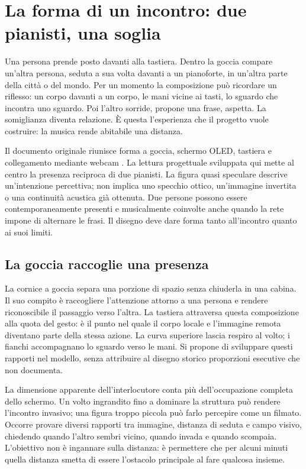 \chapter{La forma di un incontro: due pianisti, una soglia}\label{sec:design}

Una persona prende posto davanti alla tastiera. Dentro la goccia compare
un'altra persona, seduta a sua volta davanti a un pianoforte, in un'altra
parte della città o del mondo. Per un momento la composizione può ricordare
un riflesso: un corpo davanti a un corpo, le mani vicine ai tasti, lo sguardo
che incontra uno sguardo. Poi l'altro sorride, propone una frase, aspetta.
La somiglianza diventa relazione. È questa l'esperienza che il progetto
vuole costruire: la musica rende abitabile una distanza.

Il documento originale riunisce forma a goccia, schermo OLED, tastiera e
collegamento mediante webcam \cite[pp.~2--4]{terzi_peeragogy_2016}.
La lettura progettuale sviluppata qui mette al centro la presenza reciproca
di due pianisti. La figura quasi speculare descrive un'intenzione percettiva;
non implica uno specchio ottico, un'immagine invertita o una continuità
acustica già ottenuta. Due persone possono essere contemporaneamente
presenti e musicalmente coinvolte anche quando la rete impone di alternare
le frasi. Il disegno deve dare forma tanto all'incontro quanto ai suoi limiti.

\section{La goccia raccoglie una presenza}

La cornice a goccia separa una porzione di spazio senza chiuderla in una
cabina. Il suo compito è raccogliere l'attenzione attorno a una persona e
rendere riconoscibile il passaggio verso l'altra. La tastiera attraversa
questa composizione alla quota del gesto: è il punto nel quale il corpo
locale e l'immagine remota diventano parte della stessa azione. La curva
superiore lascia respiro al volto; i fianchi accompagnano lo sguardo verso
le mani. Si propone di sviluppare questi rapporti nel modello, senza
attribuire al disegno storico proporzioni esecutive che non documenta.

La dimensione apparente dell'interlocutore conta più dell'occupazione
completa dello schermo. Un volto ingrandito fino a dominare la struttura
può rendere l'incontro invasivo; una figura troppo piccola può farlo
percepire come un filmato. Occorre provare diversi rapporti tra immagine,
distanza di seduta e campo visivo, chiedendo quando l'altro sembri vicino,
quando invada e quando scompaia. L'obiettivo non è ingannare sulla distanza:
è permettere che per alcuni minuti quella distanza smetta di essere
l'ostacolo principale al fare qualcosa insieme.

